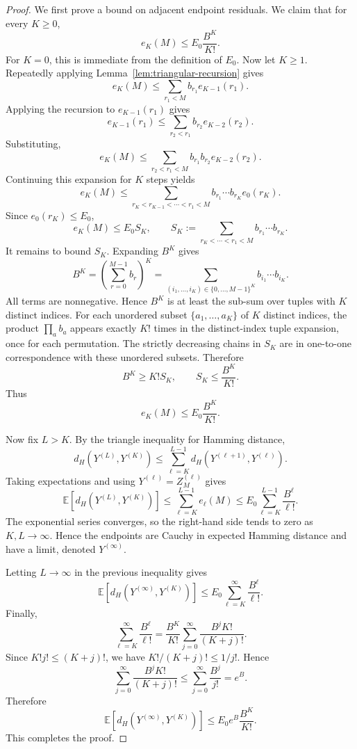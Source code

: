 \documentclass[10pt,a4paper]{amsart}
\begin{document}
\begin{proof}
We first prove a bound on adjacent endpoint residuals. We claim that for every $K\ge0$,
\[
e_K(M)\le E_0\frac{B^K}{K!}.
\]
For $K=0$, this is immediate from the definition of $E_0$. Now let $K\ge1$. Repeatedly applying Lemma~\ref{lem:triangular-recursion} gives
\[
e_K(M)
\le
\sum_{r_1<M}b_{r_1}e_{K-1}(r_1).
\]
Applying the recursion to $e_{K-1}(r_1)$ gives
\[
e_{K-1}(r_1)
\le
\sum_{r_2<r_1}b_{r_2}e_{K-2}(r_2).
\]
Substituting,
\[
e_K(M)
\le
\sum_{r_2<r_1<M}b_{r_1}b_{r_2}e_{K-2}(r_2).
\]
Continuing this expansion for $K$ steps yields
\[
e_K(M)
\le
\sum_{r_K<r_{K-1}<\cdots<r_1<M} b_{r_1}\cdots b_{r_K} e_0(r_K).
\]
Since $e_0(r_K)\le E_0$,
\[
e_K(M)
\le
E_0 S_K,
\qquad
S_K:=\sum_{r_K<\cdots<r_1<M} b_{r_1}\cdots b_{r_K}.
\]
It remains to bound $S_K$. Expanding $B^K$ gives
\[
B^K=\left(\sum_{r=0}^{M-1}b_r\right)^K
=\sum_{(i_1,\ldots,i_K)\in\{0,\ldots,M-1\}^K} b_{i_1}\cdots b_{i_K}.
\]
All terms are nonnegative. Hence $B^K$ is at least the sub-sum over tuples with $K$ distinct indices. For each unordered subset $\{a_1,\ldots,a_K\}$ of $K$ distinct indices, the product $\prod_{a}b_a$ appears exactly $K!$ times in the distinct-index tuple expansion, once for each permutation. The strictly decreasing chains in $S_K$ are in one-to-one correspondence with these unordered subsets. Therefore
\[
B^K\ge K!S_K,
\qquad
S_K\le \frac{B^K}{K!}.
\]
Thus
\[
e_K(M)\le E_0\frac{B^K}{K!}.
\]

Now fix $L>K$. By the triangle inequality for Hamming distance,
\[
d_H(Y^{(L)},Y^{(K)})
\le
\sum_{\ell=K}^{L-1}d_H(Y^{(\ell+1)},Y^{(\ell)}).
\]
Taking expectations and using $Y^{(\ell)}=Z_M^{(\ell)}$ gives
\[
\mathbb E[d_H(Y^{(L)},Y^{(K)})]
\le
\sum_{\ell=K}^{L-1}e_\ell(M)
\le
E_0\sum_{\ell=K}^{L-1}\frac{B^\ell}{\ell!}.
\]
The exponential series converges, so the right-hand side tends to zero as $K,L\to\infty$. Hence the endpoints are Cauchy in expected Hamming distance and have a limit, denoted $Y^{(\infty)}$.

Letting $L\to\infty$ in the previous inequality gives
\[
\mathbb E[d_H(Y^{(\infty)},Y^{(K)})]
\le
E_0\sum_{\ell=K}^{\infty}\frac{B^\ell}{\ell!}.
\]
Finally,
\[
\sum_{\ell=K}^{\infty}\frac{B^\ell}{\ell!}
=
\frac{B^K}{K!}\sum_{j=0}^{\infty}\frac{B^j K!}{(K+j)!}.
\]
Since $K!j!\le (K+j)!$, we have $K!/(K+j)!\le1/j!$. Hence
\[
\sum_{j=0}^{\infty}\frac{B^j K!}{(K+j)!}
\le
\sum_{j=0}^{\infty}\frac{B^j}{j!}
=e^B.
\]
Therefore
\[
\mathbb E[d_H(Y^{(\infty)},Y^{(K)})]
\le
E_0 e^B\frac{B^K}{K!}.
\]
This completes the proof.
\end{proof}
\end{document}
